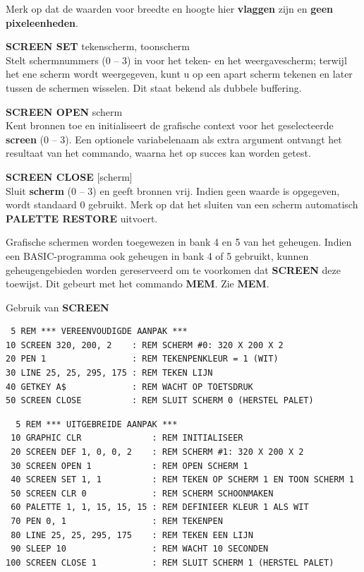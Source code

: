\begin{description}[leftmargin=2cm,style=nextline]
Merk op dat de waarden voor breedte en hoogte hier {\bf vlaggen} zijn en {\bf geen pixeleenheden}.

{\bf SCREEN SET} tekenscherm, toonscherm \\                  Stelt schermnummers (0 -- 3) in voor het teken- en het weergavescherm; terwijl het ene scherm wordt weergegeven, kunt u op een apart scherm tekenen en later tussen de schermen wisselen. Dit staat bekend als dubbele buffering.

                  {\bf SCREEN OPEN} scherm \\                  Kent bronnen toe en initialiseert de grafische context voor het geselecteerde {\bf screen} (0 -- 3). Een optionele variabelenaam als extra argument ontvangt het resultaat van het commando, waarna het op succes kan worden getest.

{\bf SCREEN CLOSE} [scherm] \\                  Sluit {\bf scherm} (0 -- 3) en geeft bronnen vrij. Indien geen waarde is opgegeven, wordt standaard 0 gebruikt. Merk op dat het sluiten van een scherm automatisch {\bf PALETTE RESTORE} uitvoert.

\item [Opmerkingen:]  Grafische schermen worden toegewezen in bank 4 en 5 van het geheugen. Indien een BASIC-programma ook geheugen in bank 4 of 5 gebruikt, kunnen geheugengebieden worden gereserveerd om te voorkomen dat {\bf SCREEN} deze toewijst. Dit gebeurt met het commando {\bf MEM}. Zie {\bf MEM}.

\item [Voorbeelden:] Gebruik van {\bf SCREEN}

\begin{tcolorbox}[colback=black,coltext=white]
\verbatimfont{\codefont}
\begin{verbatim}
 5 REM *** VEREENVOUDIGDE AANPAK ***
10 SCREEN 320, 200, 2    : REM SCHERM #0: 320 X 200 X 2
20 PEN 1                 : REM TEKENPENKLEUR = 1 (WIT)
30 LINE 25, 25, 295, 175 : REM TEKEN LIJN
40 GETKEY A$             : REM WACHT OP TOETSDRUK
50 SCREEN CLOSE          : REM SLUIT SCHERM 0 (HERSTEL PALET)
\end{verbatim}
\end{tcolorbox}

\begin{tcolorbox}[colback=black,coltext=white]
\verbatimfont{\codefont}
\begin{verbatim}
  5 REM *** UITGEBREIDE AANPAK ***
 10 GRAPHIC CLR              : REM INITIALISEER
 20 SCREEN DEF 1, 0, 0, 2    : REM SCHERM #1: 320 X 200 X 2
 30 SCREEN OPEN 1            : REM OPEN SCHERM 1
 40 SCREEN SET 1, 1          : REM TEKEN OP SCHERM 1 EN TOON SCHERM 1
 50 SCREEN CLR 0             : REM SCHERM SCHOONMAKEN
 60 PALETTE 1, 1, 15, 15, 15 : REM DEFINIEER KLEUR 1 ALS WIT
 70 PEN 0, 1                 : REM TEKENPEN
 80 LINE 25, 25, 295, 175    : REM TEKEN EEN LIJN
 90 SLEEP 10                 : REM WACHT 10 SECONDEN
100 SCREEN CLOSE 1           : REM SLUIT SCHERM 1 (HERSTEL PALET)
\end{verbatim}
\end{tcolorbox}
\end{description}


